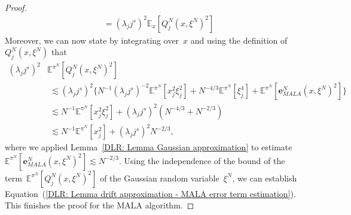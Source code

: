\begin{proof}
\begin{align*}
  & =  (\lambda_j j^s)^2  \mathbb{E}_x[Q^N_j (x, \xi^N)^2]
 \end{align*}
 Moreover, we can now state by integrating over~$x$ and using the definition of~$Q^N_j (x, \xi^N)$ that
 \begin{align*}
   (\lambda_j j^s)^2 & \mathbb{E}^{\pi^N}[Q^N_j (x, \xi^N)^2] \\
   & \; \lesssim  (\lambda_j j^s)^2 \{ N^{-1} (\lambda_j j^s)^{-2} \mathbb{E}^{\pi^N}[x_j^2\xi_j^2] + N^{-4/3} \mathbb{E}^{\pi^N}[\xi^4_j] + \mathbb{E}^{\pi^N}[  \textbf{e}^N_{MALA}(x, \xi^N)^2] \} \\
   & \; \lesssim N^{-1} \mathbb{E}^{\pi^N}[ x_j^2 \xi_j^2] +  (\lambda_j j^s)^2 (N^{-4/3} + N^{-2/3}) \\
   & \; \lesssim N^{-1} \mathbb{E}^{\pi^N}[x_j^2] +  (\lambda_j j^s)^2 N^{-2/3},
 \end{align*}
 where we applied Lemma~\ref{DLR: Lemma Gaussian approximation} to estimate $\mathbb{E}^{\pi^N}[  \textbf{e}^N_{MALA}(x, \xi^N)^2] \lesssim N^{-2/3}$. Using the independence of the bound of the term~$\mathbb{E}^{\pi^N}[Q^N_j (x, \xi^N)^2]$ of the Gaussian random variable~$\xi^N$, we can establish Equation~(\ref{DLR: Lemma drift approximation - MALA error term estimation}). This finishes the proof for the MALA algorithm.
 \newline
 

\end{proof}
